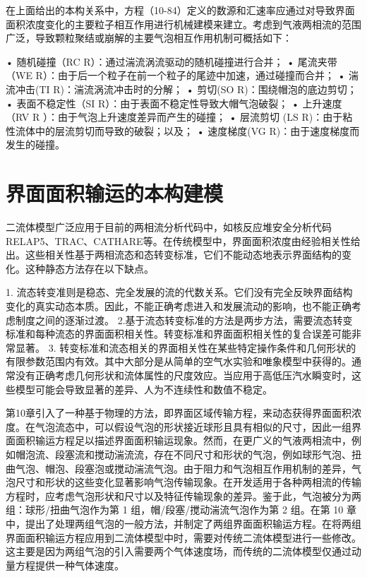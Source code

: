\documentclass[11pt,a4paper,openany,fontset=none]{ctexbook}
\begin{document}
在上面给出的本构关系中，方程（10-84）定义的数源和汇速率应通过对导致界面面积浓度变化的主要粒子相互作用进行机械建模来建立。考虑到气液两相流的范围广泛，导致颗粒聚结或崩解的主要气泡相互作用机制可概括如下：

• 随机碰撞（RC R）：通过湍流涡流驱动的随机碰撞进行合并； • 尾流夹带（WE R）：由于后一个粒子在前一个粒子的尾迹中加速，通过碰撞而合并； • 湍流冲击(TI R)：湍流涡流冲击时的分解； • 剪切(SO R)：围绕帽泡的底边剪切； • 表面不稳定性（SI R）：由于表面不稳定性导致大帽气泡破裂； • 上升速度（RV R ）：由于气泡上升速度差异而产生的碰撞； • 层流剪切 (LS R)：由于粘性流体中的层流剪切而导致的破裂；以及； • 速度梯度(VG R)：由于速度梯度而发生的碰撞。

\chapter{界面面积输运的本构建模}
二流体模型广泛应用于目前的两相流分析代码中，如核反应堆安全分析代码RELAP5、TRAC、CATHARE等。在传统模型中，界面面积浓度由经验相关性给出。这些相关性基于两相流态和态转变标准，它们不能动态地表示界面结构的变化。这种静态方法存在以下缺点。

1. 流态转变准则是稳态、完全发展的流的代数关系。它们没有完全反映界面结构变化的真实动态本质。因此，不能正确考虑进入和发展流动的影响，也不能正确考虑制度之间的逐渐过渡。 2.基于流态转变标准的方法是两步方法，需要流态转变标准和每种流态的界面面积相关性。转变标准和界面面积相关性的复合误差可能非常显著。 3. 转变标准和流态相关的界面相关性在某些特定操作条件和几何形状的有限参数范围内有效。其中大部分是从简单的空气水实验和唯象模型中获得的。通常没有正确考虑几何形状和流体属性的尺度效应。当应用于高低压汽水瞬变时，这些模型可能会导致显著的差异、人为不连续性和数值不稳定。

第10章引入了一种基于物理的方法，即界面区域传输方程，来动态获得界面面积浓度。在气泡流态中，可以假设气泡的形状接近球形且具有相似的尺寸，因此一组界面面积输运方程足以描述界面面积输运现象。然而，在更广义的气液两相流中，例如帽泡流、段塞流和搅动湍流流，存在不同尺寸和形状的气泡，例如球形气泡、扭曲气泡、帽泡、段塞泡或搅动湍流气泡。由于阻力和气泡相互作用机制的差异，气泡尺寸和形状的这些变化显著影响气泡传输现象。在开发适用于各种两相流的传输方程时，应考虑气泡形状和尺寸以及特征传输现象的差异。鉴于此，气泡被分为两组：球形/扭曲气泡作为第 1 组，帽/段塞/搅动湍流气泡作为第 2 组。在第 10 章中，提出了处理两组气泡的一般方法，并制定了两组界面面积输运方程。在将两组界面面积输运方程应用到二流体模型中时，需要对传统二流体模型进行一些修改。这主要是因为两组气泡的引入需要两个气体速度场，而传统的二流体模型仅通过动量方程提供一种气体速度。
\end{document}
